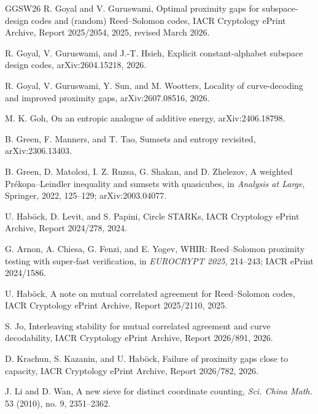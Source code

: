 \documentclass[12pt,a4paper]{amsart}
\numberwithin{equation}{section}
\theoremstyle{remark}
\begin{document}
\begin{thebibliography}{GGSW26}
R. Goyal and V. Guruswami,
\newblock Optimal proximity gaps for subspace-design codes and (random)
Reed--Solomon codes,
\newblock IACR Cryptology ePrint Archive, Report 2025/2054, 2025,
revised March 2026.

R. Goyal, V. Guruswami, and J.-T. Hsieh,
\newblock Explicit constant-alphabet subspace design codes,
\newblock arXiv:2604.15218, 2026.

R. Goyal, V. Guruswami, Y. Sun, and M. Wootters,
\newblock Locality of curve-decoding and improved proximity gaps,
\newblock arXiv:2607.08516, 2026.

M. K. Goh,
\newblock On an entropic analogue of additive energy,
\newblock arXiv:2406.18798.

B. Green, F. Manners, and T. Tao,
\newblock Sumsets and entropy revisited,
\newblock arXiv:2306.13403.

B. Green, D. Matolcsi, I. Z. Ruzsa, G. Shakan, and D. Zhelezov,
\newblock A weighted Prékopa--Leindler inequality and sumsets with quasicubes,
\newblock in \emph{Analysis at Large}, Springer, 2022, 125--129; arXiv:2003.04077.

U. Hab\"ock, D. Levit, and S. Papini,
\newblock Circle STARKs,
\newblock IACR Cryptology ePrint Archive, Report 2024/278, 2024.

G. Arnon, A. Chiesa, G. Fenzi, and E. Yogev,
\newblock WHIR: Reed--Solomon proximity testing with super-fast verification,
\newblock in \emph{EUROCRYPT 2025}, 214--243;
IACR ePrint 2024/1586.

U. Hab\"ock,
\newblock A note on mutual correlated agreement for Reed--Solomon codes,
\newblock IACR Cryptology ePrint Archive, Report 2025/2110, 2025.

S. Jo,
\newblock Interleaving stability for mutual correlated agreement and
curve decodability,
\newblock IACR Cryptology ePrint Archive, Report 2026/891, 2026.

D. Krachun, S. Kazanin, and U. Hab\"ock,
\newblock Failure of proximity gaps close to capacity,
\newblock IACR Cryptology ePrint Archive, Report 2026/782, 2026.

J. Li and D. Wan,
\newblock A new sieve for distinct coordinate counting,
\newblock \emph{Sci. China Math.} 53 (2010), no. 9, 2351--2362.


\end{thebibliography}
\end{document}
